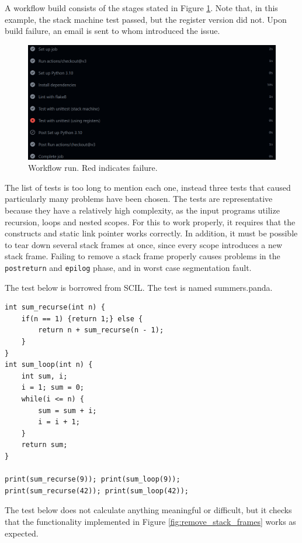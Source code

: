 A workflow build consists of the stages stated in Figure \ref{fig:workflow_run}.  Note that, in this example, the stack machine test passed, but the register version did not. Upon build failure, an email is sent to whom introduced the issue.

\begin{figure}[H]
    \centering
    \includegraphics[width=1\textwidth]{misc/images/workflow_run.png}
    \caption{Workflow run. Red indicates failure.}
    \label{fig:workflow_run}
\end{figure}

The list of tests is too long to mention each one, instead three tests that caused particularly many problems have been chosen. The tests are representative because they have a relatively high complexity, as the input programs utilize recursion, loops and nested scopes. For this to work properly, it requires that the constructs and static link pointer works correctly. In addition, it must be possible to tear down several stack frames at once, since every scope introduces a new stack frame. Failing to remove a stack frame properly causes problems in the \texttt{postreturn} and \texttt{epilog} phase, and in worst case segmentation fault. 

The test below is borrowed from SCIL. The test is named summers.panda.

\begin{verbatim}
int sum_recurse(int n) {
    if(n == 1) {return 1;} else {
        return n + sum_recurse(n - 1);
    }
}
int sum_loop(int n) {
    int sum, i;
    i = 1; sum = 0;
    while(i <= n) {
        sum = sum + i;
        i = i + 1;
    }
    return sum;
}

print(sum_recurse(9)); print(sum_loop(9));
print(sum_recurse(42)); print(sum_loop(42));
\end{verbatim}

The test below does not calculate anything meaningful or difficult, but it checks that the functionality implemented in Figure \ref{fig:remove_stack_frames} works as expected.

